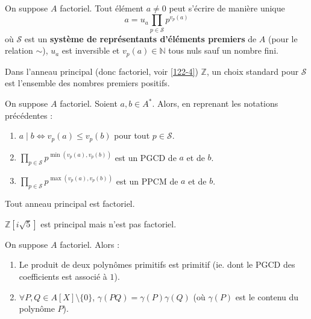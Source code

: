 
	\begin{proposition}
		On suppose $A$ factoriel. Tout élément $a \neq 0$ peut s'écrire de manière unique
		\[ a = u_a \prod_{p \in \mathcal{S}} p^{v_p(a)} \]
		où $\mathcal{S}$ est un \textbf{système de représentants d'éléments premiers} de $A$ (pour le relation $\sim$), $u_a$ est inversible et $v_p(a) \in \mathbb{N}$ tous nuls sauf un nombre fini.
	\end{proposition}

	\begin{example}
		Dans l'anneau principal (donc factoriel, voir \cref{122-4}) $\mathbb{Z}$, un choix standard pour $\mathcal{S}$ est l'ensemble des nombres premiers positifs.
	\end{example}

	\begin{proposition}
		On suppose $A$ factoriel. Soient $a, b \in A^*$. Alors, en reprenant les notations précédentes :
		\begin{enumerate}[label=(\roman*)]
			\item $a \mid b \iff v_p(a) \leq v_p(b)$ pour tout $p \in \mathcal{S}$.
			\item $\prod_{p \in \mathcal{S}} p^{\min(v_p(a), v_p(b))}$ est un PGCD de $a$ et de $b$.
			\item $\prod_{p \in \mathcal{S}} p^{\max(v_p(a), v_p(b))}$ est un PPCM de $a$ et de $b$.
		\end{enumerate}
	\end{proposition}

	\begin{theorem}
		\label{122-4}
		Tout anneau principal est factoriel.
	\end{theorem}

	\begin{cexample}
		$\mathbb{Z}[i\sqrt{5}]$ est principal mais n'est pas factoriel.
	\end{cexample}


	\begin{lemma}[Gauss]
		On suppose $A$ factoriel. Alors :
		\begin{enumerate}[label=(\roman*)]
			\item Le produit de deux polynômes primitifs est primitif (ie. dont le PGCD des coefficients est associé à $1$).
			\item $\forall P, Q \in A[X] \setminus \{ 0 \}$, $\gamma(PQ) = \gamma(P) \gamma(Q)$ (où $\gamma(P)$ est le contenu du polynôme $P$).
		\end{enumerate}
	\end{lemma}

